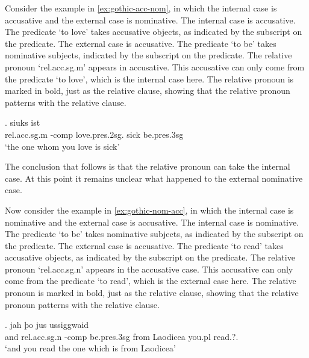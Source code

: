 Consider the example in \ref{ex:gothic-acc-nom}, in which the internal case is accusative and the external case is nominative.
The internal case is accusative. The predicate  `to love' takes accusative objects, as indicated by the subscript on the predicate.
The external case is accusative. The predicate  `to be' takes nominative subjects, indicated by the subscript on the predicate.
The relative pronoun  `\ac{rel}.\ac{acc}.\ac{sg}.\ac{m}' appears in accusative. This accusative can only come from the predicate  `to love', which is the internal case here. The relative pronoun is marked in bold, just as the relative clause, showing that the relative pronoun patterns with the relative clause.

\exg.    siuks ist\\
 \ac{rel}.\ac{acc}.\ac{sg}.\ac{m} -\ac{comp} love.\ac{pres}.2\ac{sg}.\scsub{[acc]} sick be.\ac{pres}.3\ac{sg}\scsub{[nom]}\\
 `the one whom you love is sick' \label{ex:gothic-acc-nom}

The conclusion that follows is that the relative pronoun can take the internal case. At this point it remains unclear what happened to the external nominative case.

Now consider the example in \ref{ex:gothic-nom-acc}, in which the internal case is nominative and the external case is accusative.
The internal case is nominative. The predicate  `to be' takes nominative subjects, as indicated by the subscript on the predicate.
The external case is accusative. The predicate  `to read' takes accusative objects, as indicated by the subscript on the predicate.
The relative pronoun  `\ac{rel}.\ac{acc}.\ac{sg}.\ac{n}' appears in the accusative case. This accusative can only come from the predicate  `to read', which is the external case here. The relative pronoun is marked in bold, just as the relative clause, showing that the relative pronoun patterns with the relative clause.

\exg. jah þo     jus ussiggwaid\\
 and \ac{rel}.\ac{acc}.\ac{sg}.\ac{n} -\ac{comp} be.\ac{pres}.3\ac{sg}\scsub{[nom]} from Laodicea you.\ac{pl} read.?.\scsub{[acc]}\\
 `and you read the one which is from Laodicea' \label{ex:gothic-nom-acc}

